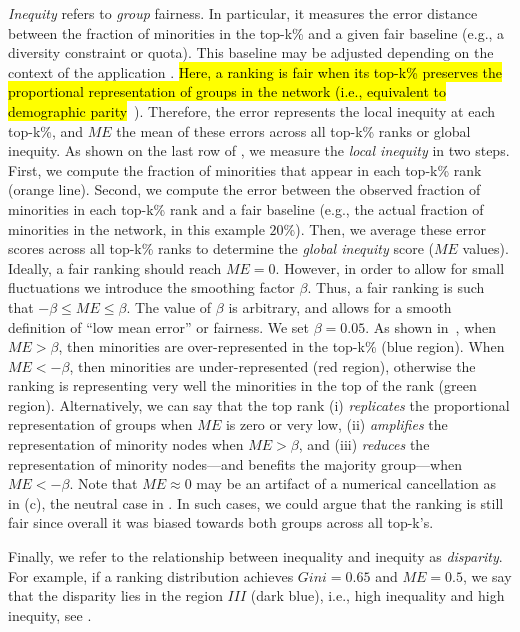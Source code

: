 \documentclass[fleqn,10pt]{wlscirep}
\begin{document}
\textit{Inequity} refers to \textit{group} fairness.
In particular, it measures the error distance between the fraction of minorities in the top-k\% and a given fair baseline (e.g., a diversity constraint or quota).
%
This baseline may be adjusted depending on the context of the application \cite{drosou2017diversity,singh2018fairness,zehlike2021fairness}. 
\hl{Here, a ranking is fair when its top-k\% preserves the proportional representation of groups in the network (i.e., equivalent to demographic parity}~\cite{dwork2012fairness, zehlike2021fairness}). Therefore, the error represents the local inequity at each top-k\%, and $ME$ the mean of these errors across all top-k\% ranks or global inequity.
%
As shown on the last row of , we measure the \textit{local inequity} in two steps. First, we compute the fraction of minorities that appear in each top-k\% rank (orange line). Second, we compute the error between the observed fraction of minorities in each top-k\% rank and a fair baseline (e.g., the actual fraction of minorities in the network, in this example $20\%$). Then, we average these error scores across all top-k\% ranks to determine the \textit{global inequity} score ($ME$ values). %
Ideally, a fair ranking should reach $ME=0$. However, in order to allow for small fluctuations we introduce the smoothing factor $\beta$. Thus, a fair ranking is such that $-\beta \leq ME \leq \beta$. %
The value of $\beta$ is arbitrary, and allows for a smooth definition of ``low mean error'' or fairness. We set $\beta=0.05$. 
As shown in~, when $ME>\beta$, then minorities are over-represented in the top-k\% (blue region). 
%
When $ME<-\beta$, then minorities are under-represented (red region), otherwise %
the ranking is representing very well the minorities in the top of the rank (green region). %
Alternatively, we can say that the top rank (i) \textit{replicates} the proportional representation of groups when $ME$ is zero or very low, (ii) \textit{amplifies} the representation of minority nodes when $ME>\beta$, and (iii) \textit{reduces} the representation of minority nodes---and benefits the majority group---when $ME<-\beta$.
Note that $ME\approx 0$ may be an artifact of a numerical cancellation as in (c), the neutral case in . In such cases, we could argue that the ranking is still fair since overall it was biased towards both groups across all top-k's.




Finally, we refer to the relationship between inequality and inequity as \textit{disparity}. For example, if a ranking distribution achieves $Gini=0.65$ and $ME=0.5$, we say that the disparity lies in the region $III$ (dark blue), i.e., high inequality and high inequity, see . 
\end{document}
